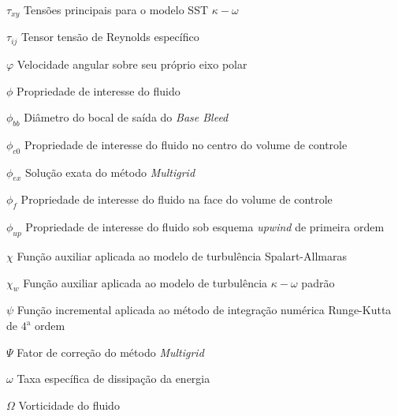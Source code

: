 \begin{simbolos}
  \item[$\tau_{xy}$] Tensões principais para o modelo SST $\kappa-\omega$
  \item[$\tau_{ij}$] Tensor tensão de Reynolds específico
  \item[$\varphi$] Velocidade angular sobre seu próprio eixo polar
  \item[$\phi$] Propriedade de interesse do fluido
  \item[$\phi_{bb}$] Diâmetro do bocal de saída do \textit{Base Bleed}
  \item[$\phi_{c0}$] Propriedade de interesse do fluido no centro do volume de controle
  \item[$\phi_{ex}$] Solução exata do método \textit{Multigrid}
  \item[$\phi_f$] Propriedade de interesse do fluido na face do volume de controle
  \item[$\phi_{up}$] Propriedade de interesse do fluido sob esquema \textit{upwind} de primeira ordem
  \item[$\chi$] Função auxiliar aplicada ao modelo de turbulência Spalart-Allmaras
  \item[$\chi_w$] Função auxiliar aplicada ao modelo de turbulência $\kappa-\omega$ padrão
  \item[$\psi$] Função incremental aplicada ao método de integração numérica Runge-Kutta de $4^\text{a}$ ordem
  \item[$\Psi$] Fator de correção do método \textit{Multigrid}
  \item[$\omega$] Taxa específica de dissipação da energia
  \item[$\Omega$] Vorticidade do fluido
\end{simbolos}